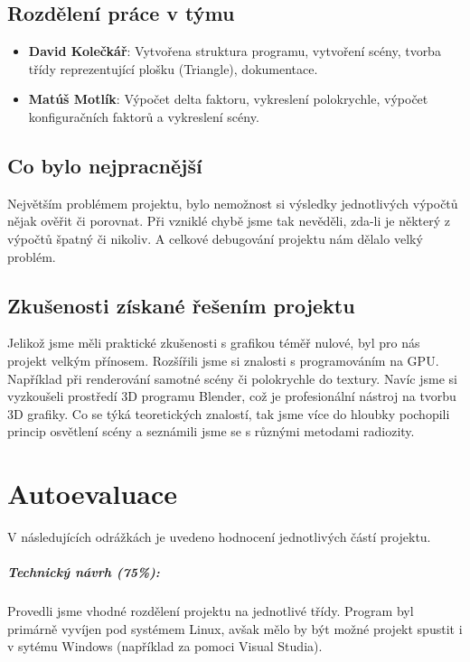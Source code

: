 \documentclass[12pt,a4paper,titlepage,final]{report}
\newcommand\AuthorA{David Kolečkář}
\newcommand\AuthorB{Matúš Motlík}
\begin{document}
\section{Rozdělení práce v týmu}

\begin{itemize}
\item \textbf{\AuthorA}: Vytvořena struktura programu, vytvoření scény, tvorba třídy reprezentující plošku (Triangle), dokumentace.
\item \textbf{\AuthorB}: Výpočet delta faktoru, vykreslení polokrychle, výpočet konfiguračních faktorů a vykreslení scény.
\end{itemize}

\section{Co bylo nejpracnější}

Největším problémem projektu, bylo nemožnost si výsledky jednotlivých výpočtů nějak ověřit či porovnat. Při vzniklé chybě jsme tak nevěděli, zda-li je některý z výpočtů špatný či nikoliv. A celkové debugování projektu nám dělalo velký problém. 


\section{Zkušenosti získané řešením projektu}

Jelikož jsme měli praktické zkušenosti s grafikou téměř nulové, byl pro nás projekt velkým přínosem. Rozšířili jsme si znalosti s programováním na GPU. Například při renderování samotné scény či polokrychle do textury. Navíc jsme si vyzkoušeli prostředí 3D programu Blender, což je profesionální nástroj na tvorbu 3D grafiky. Co se týká teoretických znalostí, tak jsme více do hloubky pochopili princip osvětlení scény a seznámili jsme se s různými metodami radiozity.

\chapter{Autoevaluace}

V následujících odrážkách je uvedeno hodnocení jednotlivých částí projektu.

\paragraph{Technický návrh (75\%):} Provedli jsme vhodné rozdělení projektu na jednotlivé třídy. Program byl primárně vyvíjen pod systémem Linux, avšak mělo by být možné projekt spustit i v sytému Windows (například za pomoci Visual Studia).
\end{document}
